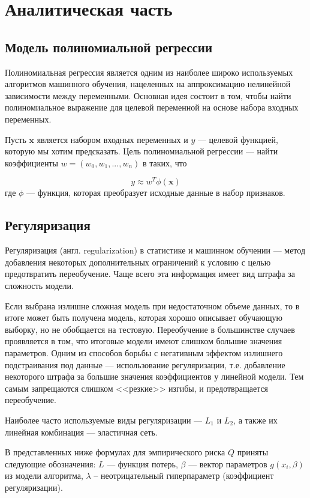 \chapter{Аналитическая часть}



\section{Модель полиномиальной регрессии}

Полиномиальная регрессия является одним из наиболее широко используемых алгоритмов машинного обучения, нацеленных на аппроксимацию нелинейной зависимости между переменными. Основная 
идея состоит в том, чтобы найти полиномиальное выражение для целевой переменной на основе набора входных переменных.

Пусть $\mathbf{x}$ является набором входных переменных и $y$ — целевой функцией, которую мы хотим предсказать. Цель полиномиальной регрессии — найти коэффициенты $w = (w_0, w_1, ..., 
w_n)$ в таких, что

$$y \approx w^T\phi(\mathbf{x})$$где $\phi$ — функция, которая преобразует исходные данные в набор признаков.



\section{Регуляризация}

Регуляризация (англ. regularization) в статистике и машинном обучении — метод добавления некоторых дополнительных ограничений к условию с целью предотвратить переобучение. Чаще всего эта информация имеет вид штрафа за сложность модели.

Если выбрана излишне сложная модель при недостаточном объеме данных, то в итоге может быть получена модель, которая хорошо описывает обучающую выборку, но не обобщается на тестовую. Переобучение в большинстве случаев проявляется в том, что итоговые модели имеют слишком большие значения параметров. Одним из способов борьбы с негативным эффектом излишнего подстраивания под данные — использование регуляризации, т.е. добавление некоторого штрафа за большие значения коэффициентов у линейной модели. Тем самым запрещаются слишком <<резкие>> изгибы, и предотвращается переобучение.

Наиболее часто используемые виды регуляризации — $L_1$ и $L_2$, а также их линейная комбинация — эластичная сеть. 

В представленных ниже формулах для эмпирического риска $Q$ приняты следующие обозначения: $L$ --- функция потерь, $\beta$ --- вектор параметров $g(x_i, \beta)$ из модели алгоритма, $\lambda$ – неотрицательный гиперпараметр (коэффициент регуляризации).

